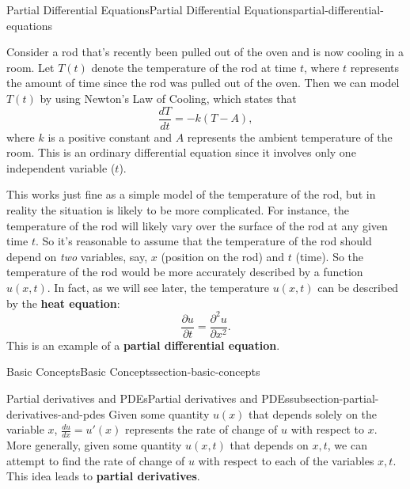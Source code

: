 \documentclass[oneside,10pt,]{book}
\newcommand{\terminology}[1]{\textbf{#1}}
\numberwithin{equation}{section}
\begin{document}
\begin{chapterptx}{Partial Differential Equations}{}{Partial Differential Equations}{}{}{partial-differential-equations}
\begin{introduction}{}%
\hypertarget{p-627}{}%
Consider a rod that's recently been pulled out of the oven and is now cooling in a room. Let \(T(t)\) denote the temperature of the rod at time \(t\), where \(t\) represents the amount of time since the rod was pulled out of the oven. Then we can model \(T(t)\) by using Newton's Law of Cooling, which states that%
\begin{equation*}
\frac{dT}{dt} = -k(T-A),
\end{equation*}
where \(k\) is a positive constant and \(A\) represents the ambient temperature of the room. This is an ordinary differential equation since it involves only one independent variable (\(t\)).%
\par
\hypertarget{p-628}{}%
This works just fine as a simple model of the temperature of the rod, but in reality the situation is likely to be more complicated. For instance, the temperature of the rod will likely vary over the surface of the rod at any given time \(t\). So it's reasonable to assume that the temperature of the rod should depend on \emph{two} variables, say, \(x\) (position on the rod) and \(t\) (time). So the temperature of the rod would be more accurately described by a function \(u(x,t)\). In fact, as we will see later, the temperature \(u(x,t)\) can be described by the \terminology{heat equation}:%
%
\begin{equation*}
\frac{\partial u}{\partial t} = \frac{\partial^{2}u}{\partial x^{2}}.
\end{equation*}
\hypertarget{p-629}{}%
This is an example of a \terminology{partial differential equation}.%
\end{introduction}%
%
%
\typeout{************************************************}
\typeout{************************************************}
%
\begin{sectionptx}{Basic Concepts}{}{Basic Concepts}{}{}{section-basic-concepts}
%
%
\typeout{************************************************}
\typeout{************************************************}
%
\begin{subsectionptx}{Partial derivatives and PDEs}{}{Partial derivatives and PDEs}{}{}{subsection-partial-derivatives-and-pdes}
\hypertarget{p-630}{}%
Given some quantity \(u(x)\) that depends solely on the variable \(x\), \(\frac{du}{dx} = u'(x)\) represents the rate of change of \(u\) with respect to \(x\). More generally, given some quantity \(u(x,t)\) that depends on \(x,t\), we can attempt to find the rate of change of \(u\) with respect to each of the variables \(x,t\). This idea leads to \terminology{partial derivatives}.%

\end{subsectionptx}
\end{sectionptx}
\end{chapterptx}
\end{document}
